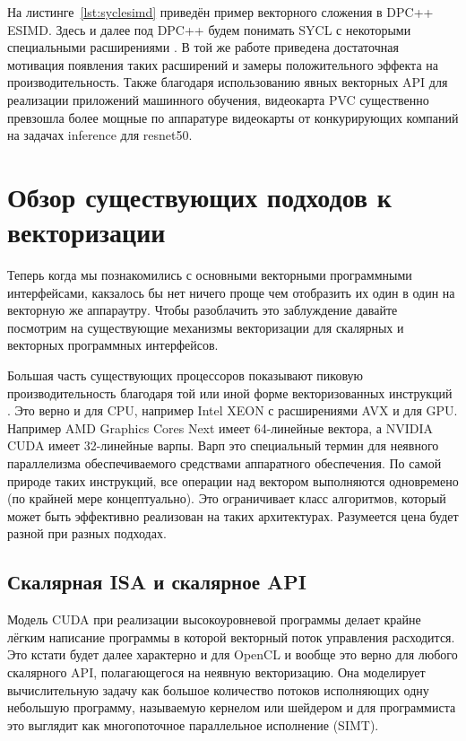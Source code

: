 На листинге~\cref{lst:syclesimd} приведён пример векторного сложения в DPC++ ESIMD. Здесь и далее под DPC++ будем понимать SYCL с некоторыми специальными расширениями \cite{reinders2021dpc}. В той же работе приведена достаточная мотивация появления таких расширений и замеры положительного эффекта на производительность. Также благодаря использованию явных векторных API для реализации приложений машинного обучения, видеокарта PVC \cite{gomes2022ponte} существенно превзошла более мощные по аппаратуре видеокарты от конкурирующих компаний на задачах inference для resnet50.

\section{Обзор существующих подходов к векторизации}\label{sec:overview/vectorizing}

Теперь когда мы познакомились с основными векторными программными интерфейсами, какзалось бы нет ничего проще чем отобразить их один в один на векторную же аппараутру. Чтобы разоблачить это заблуждение давайте посмотрим на существующие механизмы векторизации для скалярных и векторных программных интерфейсов.

Большая часть существующих процессоров показывают пиковую производительность благодаря той или иной форме векторизованных инструкций \cite{bialas2015benchmarking}. Это верно и для CPU, например Intel XEON с расширениями AVX и для GPU. Например AMD Graphics Cores Next имеет 64-линейные вектора, а NVIDIA CUDA имеет 32-линейные варпы. Варп \cite{passerat2015warp} это специальный термин для неявного параллелизма обеспечиваемого средствами аппаратного обеспечения. По самой природе таких инструкций, все операции над вектором выполняются одновремено (по крайней мере концептуально). Это ограничивает класс алгоритмов, который может быть эффективно реализован на таких архитектурах. Разумеется цена будет разной при разных подходах.

\subsection{Скалярная ISA и скалярное API}\label{subsec:overview/vectorizing/cuda}

Модель CUDA при реализации высокоуровневой программы делает крайне лёгким написание программы в которой векторный поток управления расходится. Это кстати будет далее характерно и для OpenCL и вообще это верно для любого скалярного API, полагающегося на неявную векторизацию. Она моделирует вычислительную задачу как большое количество потоков исполняющих одну небольшую программу, называемую кернелом или шейдером и для программиста это выглядит как многопоточное параллельное исполнение (SIMT).

